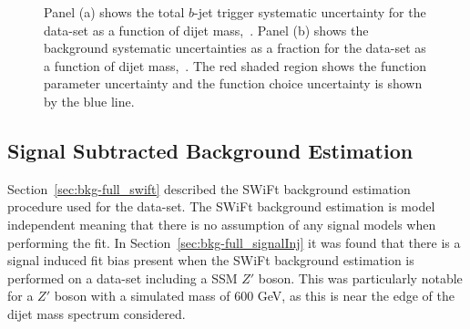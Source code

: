 \begin{figure}[!ht]
  \begin{center}
    \captionsetup[subfigure]{aboveskip=0pt,justification=centering}
  \end{center}
  \vspace{-1mm}
  \caption{Panel (a) shows the total $b$-jet trigger systematic uncertainty for the \lm{} data-set as a function of dijet mass,~\mjj.
    Panel (b) shows the background systematic uncertainties as a fraction for the \lm{} data-set as a function of dijet mass,~\mjj.
    The red shaded region shows the function parameter uncertainty and the function choice uncertainty is shown by the blue line.}
  \label{fig:lim-lowmass_syst}
\end{figure}

\subsection{Signal Subtracted Background Estimation}
\label{sec:lim-full_ssb}

Section~\ref{sec:bkg-full_swift} described the SWiFt background estimation procedure used for the \lm{} data-set.
The SWiFt background estimation is model independent meaning that there is no assumption of any signal models when performing the fit.
In Section~\ref{sec:bkg-full_signalInj} it was found that there is a signal induced fit bias present when
the SWiFt background estimation is performed on a data-set including a SSM $Z'$ boson.
This was particularly notable for a $Z'$ boson with a simulated mass of 600 GeV,
as this is near the edge of the dijet mass spectrum considered.

